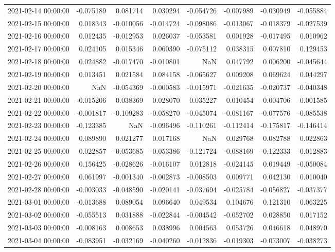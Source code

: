 \begin{tabular}{lrrrrrrr}
2021-02-14 00:00:00 & -0.075189 & 0.081714 & 0.030294 & -0.054726 & -0.007989 & -0.030949 & -0.055884 \\
2021-02-15 00:00:00 & 0.018343 & -0.010056 & -0.014724 & -0.098086 & -0.013067 & -0.018379 & -0.027539 \\
2021-02-16 00:00:00 & 0.012435 & -0.012953 & 0.026037 & -0.053581 & 0.001928 & -0.017495 & 0.010962 \\
2021-02-17 00:00:00 & 0.024105 & 0.015346 & 0.060390 & -0.075112 & 0.038315 & 0.007810 & 0.129453 \\
2021-02-18 00:00:00 & 0.024882 & -0.017470 & -0.010801 & NaN & 0.047792 & 0.006200 & -0.045644 \\
2021-02-19 00:00:00 & 0.013451 & 0.021584 & 0.084158 & -0.065627 & 0.009208 & 0.069624 & 0.044297 \\
2021-02-20 00:00:00 & NaN & -0.054369 & -0.000583 & -0.015971 & -0.021635 & -0.020737 & -0.040348 \\
2021-02-21 00:00:00 & -0.015206 & 0.038369 & 0.028070 & 0.035227 & 0.010454 & 0.004706 & 0.001585 \\
2021-02-22 00:00:00 & -0.001817 & -0.109283 & -0.058270 & -0.045074 & -0.081167 & -0.077576 & -0.085538 \\
2021-02-23 00:00:00 & -0.123385 & NaN & -0.096496 & -0.110261 & -0.112414 & -0.175817 & -0.146414 \\
2021-02-24 00:00:00 & 0.089890 & 0.021277 & 0.017168 & NaN & 0.029768 & 0.082788 & 0.022863 \\
2021-02-25 00:00:00 & 0.022857 & -0.053685 & -0.053386 & -0.121724 & -0.088169 & -0.122333 & -0.012883 \\
2021-02-26 00:00:00 & 0.156425 & -0.028626 & -0.016107 & 0.012818 & -0.024145 & 0.019449 & -0.050084 \\
2021-02-27 00:00:00 & 0.061997 & -0.001340 & -0.002873 & -0.008503 & 0.009771 & 0.042130 & 0.010040 \\
2021-02-28 00:00:00 & -0.003033 & -0.048590 & -0.020141 & -0.037694 & -0.025784 & -0.056827 & -0.037377 \\
2021-03-01 00:00:00 & -0.013688 & 0.089054 & 0.096640 & 0.049534 & 0.104676 & 0.121310 & 0.063225 \\
2021-03-02 00:00:00 & -0.055513 & 0.031888 & -0.022844 & -0.004542 & -0.052702 & 0.028850 & 0.017152 \\
2021-03-03 00:00:00 & -0.008163 & 0.008653 & 0.038996 & 0.004563 & 0.053726 & 0.046618 & 0.048970 \\
2021-03-04 00:00:00 & -0.083951 & -0.032169 & -0.040260 & -0.012836 & -0.019303 & -0.073007 & -0.038273 \\

\end{tabular}
